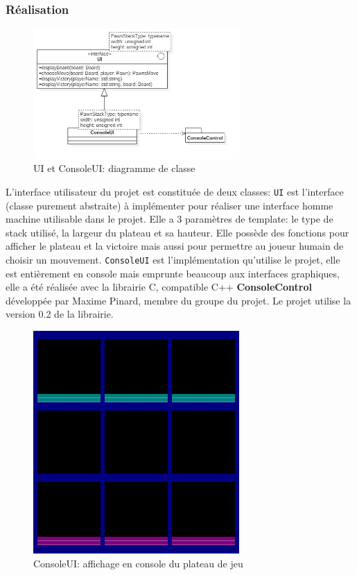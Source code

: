 \documentclass[article, backcover, french, nodocumentinfo]{upmethodology-document}
\begin{document}
			\subsubsection{Réalisation}
				\begin{figure}[h!]
					\centering
					\includegraphics[width=0.7\textwidth]{figures/UIDiagram}
					\caption{UI et ConsoleUI: diagramme de classe}
					\label{fig:UIDiagram}
				\end{figure}
				L'interface utilisateur du projet est constituée de deux classes:
					\texttt{UI} est l'interface (classe purement abstraite) à implémenter pour réaliser une interface homme machine utilisable dans le projet. Elle a 3 paramètres de template: le type de stack utilisé, la largeur du plateau et sa hauteur. Elle possède des fonctions pour afficher le plateau et la victoire mais aussi pour permettre au joueur humain de choisir un mouvement.
					\texttt{ConsoleUI} est l'implémentation qu'utilise le projet, elle est entièrement en console mais emprunte beaucoup aux interfaces graphiques, elle a été réalisée avec la librairie C, compatible C++ \textbf{ConsoleControl} développée par Maxime Pinard, membre du groupe du projet. Le projet utilise la version 0.2 de la librairie.
					\begin{figure}[h!]
						\centering
						\includegraphics[width=0.7\textwidth]{figures/ConsoleUI}
						\caption{ConsoleUI: affichage en console du plateau de jeu}
						\label{fig:ConsoleUI}
					\end{figure}
\end{document}
